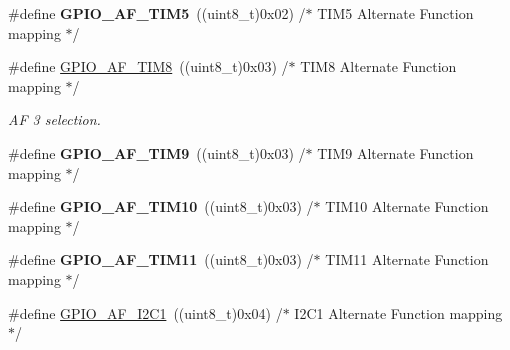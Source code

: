 \begin{DoxyCompactItemize}
\item 
\hypertarget{group___g_p_i_o___alternat__function__selection__define_gad1abee116e98620ade37334e649e6006}{\#define {\bfseries G\-P\-I\-O\-\_\-\-A\-F\-\_\-\-T\-I\-M5}~((uint8\-\_\-t)0x02)  /$\ast$ T\-I\-M5 Alternate Function mapping $\ast$/}\label{group___g_p_i_o___alternat__function__selection__define_gad1abee116e98620ade37334e649e6006}

\item 
\hypertarget{group___g_p_i_o___alternat__function__selection__define_gaf7562d5cf5d33dbc7b7c69df63182583}{\#define \hyperlink{group___g_p_i_o___alternat__function__selection__define_gaf7562d5cf5d33dbc7b7c69df63182583}{G\-P\-I\-O\-\_\-\-A\-F\-\_\-\-T\-I\-M8}~((uint8\-\_\-t)0x03)  /$\ast$ T\-I\-M8 Alternate Function mapping $\ast$/}\label{group___g_p_i_o___alternat__function__selection__define_gaf7562d5cf5d33dbc7b7c69df63182583}

\begin{DoxyCompactList}\small\item\em A\-F 3 selection. \end{DoxyCompactList}\item 
\hypertarget{group___g_p_i_o___alternat__function__selection__define_ga6c7cfbf2f21945814c6526a7bacb1384}{\#define {\bfseries G\-P\-I\-O\-\_\-\-A\-F\-\_\-\-T\-I\-M9}~((uint8\-\_\-t)0x03)  /$\ast$ T\-I\-M9 Alternate Function mapping $\ast$/}\label{group___g_p_i_o___alternat__function__selection__define_ga6c7cfbf2f21945814c6526a7bacb1384}

\item 
\hypertarget{group___g_p_i_o___alternat__function__selection__define_ga3881c36c71f0cbd7efacb424b39cd9f4}{\#define {\bfseries G\-P\-I\-O\-\_\-\-A\-F\-\_\-\-T\-I\-M10}~((uint8\-\_\-t)0x03)  /$\ast$ T\-I\-M10 Alternate Function mapping $\ast$/}\label{group___g_p_i_o___alternat__function__selection__define_ga3881c36c71f0cbd7efacb424b39cd9f4}

\item 
\hypertarget{group___g_p_i_o___alternat__function__selection__define_gaeb30ba1cb15de0d4af78933e9dcfd033}{\#define {\bfseries G\-P\-I\-O\-\_\-\-A\-F\-\_\-\-T\-I\-M11}~((uint8\-\_\-t)0x03)  /$\ast$ T\-I\-M11 Alternate Function mapping $\ast$/}\label{group___g_p_i_o___alternat__function__selection__define_gaeb30ba1cb15de0d4af78933e9dcfd033}

\item 
\hypertarget{group___g_p_i_o___alternat__function__selection__define_gaa246f87c460c4bb4036b8ab39e0220f1}{\#define \hyperlink{group___g_p_i_o___alternat__function__selection__define_gaa246f87c460c4bb4036b8ab39e0220f1}{G\-P\-I\-O\-\_\-\-A\-F\-\_\-\-I2\-C1}~((uint8\-\_\-t)0x04)  /$\ast$ I2\-C1 Alternate Function mapping $\ast$/}\label{group___g_p_i_o___alternat__function__selection__define_gaa246f87c460c4bb4036b8ab39e0220f1}


\end{DoxyCompactItemize}
